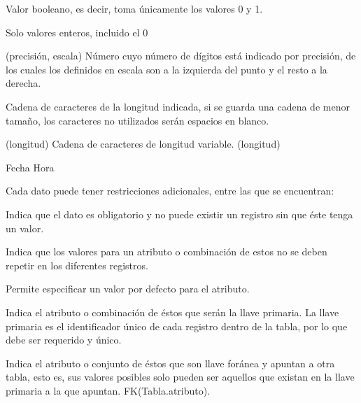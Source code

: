     \begin{bGlosario}
	    Valor booleano, es decir, toma únicamente los valores 0 y 1.

            Solo valores enteros, incluido el 0
            
         (precisión, escala)
            Número cuyo número de dígitos está indicado por precisión, de los cuales
            los definidos en escala son a la izquierda del punto y el resto a la derecha.
            
            Cadena de caracteres de la longitud indicada, si se guarda una cadena de menor
            tamaño, los caracteres no utilizados serán espacios en blanco.
            
         (longitud)
            Cadena de caracteres de longitud variable. 
         (longitud)
            
         Fecha
         Hora
    \end{bGlosario}

Cada dato puede tener restricciones adicionales, entre las que se encuentran:
    
    \begin{bGlosario}
    
            Indica que el dato es obligatorio y no puede existir un registro sin que éste tenga
            un valor.
            
            Indica que los valores para un atributo o combinación de estos no se deben
            repetir en los diferentes registros.
            
            Permite especificar un valor por defecto para el atributo.
            
            Indica el atributo o combinación de éstos que serán la llave primaria. La llave
            primaria es el identificador único de cada registro dentro de la tabla, por lo
            que debe ser requerido y único.
            
            Indica el atributo o conjunto de éstos que son llave foránea y apuntan a otra
            tabla, esto es, sus valores posibles solo pueden ser aquellos que existan en la
            llave primaria a la que apuntan. FK(Tabla.atributo).

            
    \end{bGlosario}
    

